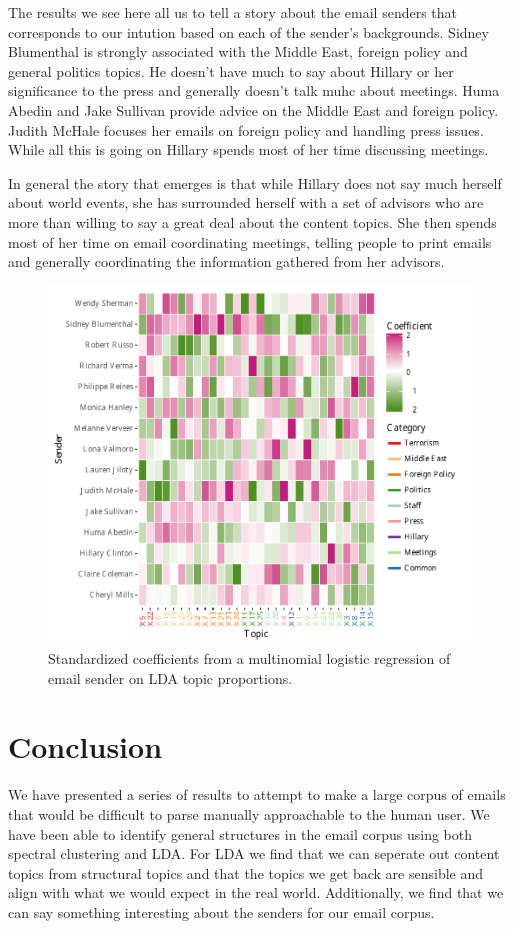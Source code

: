 \documentclass[12pt]{article}
\theoremstyle{definition}
\theoremstyle{algodesc}
\begin{document}
The results we see here all us to tell a story about the email senders that corresponds to our intution based on each of the sender's backgrounds. Sidney Blumenthal is strongly associated with the Middle East, foreign policy and general politics topics. He doesn't have much to say about Hillary or her significance to the press and generally doesn't talk muhc about meetings. Huma Abedin and Jake Sullivan provide advice on the Middle East and foreign policy. Judith McHale focuses her emails on foreign policy and handling press issues. While all this is going on Hillary spends most of her time discussing meetings.

In general the story that emerges is that while Hillary does not say much herself about world events, she has surrounded herself with a set of advisors who are more than willing to say a great deal about the content topics. She then spends most of her time on email coordinating meetings, telling people to print emails and generally coordinating the information gathered from her advisors.

\begin{figure}[htb] \centering
  \includegraphics[width=0.95\linewidth]{../images/coefficients.pdf}
  \caption{Standardized coefficients from a multinomial logistic regression of email sender on LDA topic proportions.}
  \label{fig:coefficients}
\end{figure}


\section{Conclusion}
We have presented a series of results to attempt to make a large corpus of emails that would be difficult to parse manually approachable to the human user. We have been able to identify general structures in the email corpus using both spectral clustering and LDA. For LDA we find that we can seperate out content topics from structural topics and that the topics we get back are sensible and align with what we would expect in the real world. Additionally, we find that we can say something interesting about the senders for our email corpus.
\end{document}
